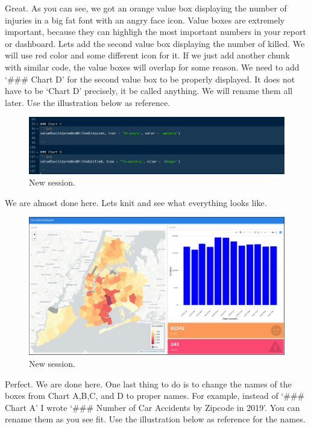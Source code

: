 \documentclass[]{book}
\begin{document}
Great. As you can see, we got an orange value box displaying the number of injuries in a big fat font with an angry face icon. Value boxes are extremely important, because they can highligh the most important numbers in your report or dashboard. Lets add the second value box displaying the number of killed. We will use red color and some different icon for it. If we just add another chunk with similar code, the value boxes will overlap for some reason. We need to add `\#\#\# Chart D' for the second value box to be properly displayed. It does not have to be `Chart D' precisely, it be called anything. We will rename them all later. Use the illustration below as reference.

\begin{figure}
\centering
\includegraphics{flex13.png}
\caption{New session.}
\end{figure}

We are almost done here. Lets knit and see what everything looks like.

\begin{figure}
\centering
\includegraphics{flex14.png}
\caption{New session.}
\end{figure}

Perfect. We are done here. One last thing to do is to change the names of the boxes from Chart A,B,C, and D to proper names. For example, instead of `\#\#\# Chart A' I wrote `\#\#\# Number of Car Accidents by Zipcode in 2019'. You can rename them as you see fit. Use the illustration below as reference for the names.
\end{document}
